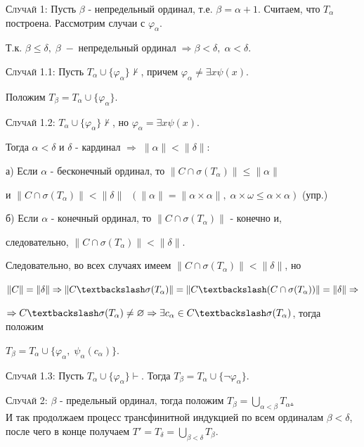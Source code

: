 \documentclass[18pt, a4paper]{extarticle}
\newcommand{\vp}{\varphi}
\begin{document}
\qquad \textsc{Случай 1:} Пусть $\beta$ - непредельный ординал, т.е. $\beta=\alpha+1$. Считаем, что $T_\alpha$ построена. Рассмотрим случаи с $\vp_\alpha$.

Т.к. $\beta\leqslant\delta,\;\beta\;-\;\text{непредельный ординал}\;\Rightarrow\beta<\delta,\;\alpha<\delta$.

\qquad\qquad \textsc{Случай 1.1:} Пусть $T_\alpha\cup\{\vp_\alpha\}\nvdash$, причем $\vp_\alpha\neq\exists x\psi(x)$.

\qquad\qquad Положим \underline{$T_\beta=T_\alpha\cup\{\vp_\alpha\}$}.
 
\qquad\qquad \textsc{Случай 1.2:}  $T_\alpha\cup\{\vp_\alpha\}\nvdash$, но $\vp_\alpha=\exists x\psi(x)$. 

\qquad\qquad Тогда $\alpha<\delta$ и $\delta$ -  кардинал $\Rightarrow\;\|\alpha\|<\|\delta\|:$

\qquad\qquad\qquad а) Если $\alpha$ -  бесконечный ординал, то $\|C\cap\sigma(T_\alpha)\|\leqslant\|\alpha\|$

\qquad\qquad\qquad и $\|C\cap\sigma(T_\alpha)\|<\|\delta\|\;\;(\|\alpha\|=\|\alpha \times\alpha\|,\;\alpha\times\omega\leqslant\alpha\times\alpha)$ (упр.)

\qquad\qquad\qquad б) Если $\alpha$ -  конечный ординал, то $\|C\cap\sigma(T_\alpha)\|$ -  конечно и, 

\qquad\qquad\qquad следовательно, $\|C\cap\sigma(T_\alpha)\|<\|\delta\|$. 

\qquad\qquad Следовательно, во всех случаях имеем $\|C\cap\sigma(T_\alpha)\|<\|\delta\|$, но

\qquad\qquad $\|C\|=\|\delta\|\Rightarrow\|C\textbackslash\sigma(T_\alpha)\|=\|C\textbackslash(C\cap\sigma(T_\alpha))\|=\|\delta\|\Rightarrow $

\qquad\qquad $\Rightarrow C\textbackslash\sigma(T_\alpha)\neq\varnothing\Rightarrow\exists c_\alpha\in C\textbackslash\sigma(T_\alpha)$, тогда положим 

\qquad\qquad \underline{$T_\beta=T_\alpha\cup\{\vp_\alpha,\;\psi_\alpha(c_\alpha)\}$}.

\qquad\qquad \textsc{Случай 1.3:} Пусть $T_\alpha\cup\{\vp_\alpha\}\vdash$. Тогда \underline{$T_\beta=T_\alpha\cup\{\lnot\vp_\alpha\}$}.

\qquad \textsc{Случай 2:} $\beta$ -  предельный ординал, тогда положим \underline{$T_\beta=\underset{\alpha<\beta}{\bigcup}T_\alpha$.}\\

И так продолжаем процесс трансфинитной индукцией по всем ординалам $\beta<\delta$, после чего в конце получаем $T'=T_\delta=\underset{\beta<\delta}{\bigcup}T_\beta$.
\end{document}
